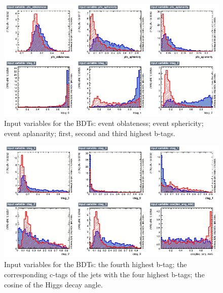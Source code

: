\begin{figure}[p]
	\centering
	\includegraphics[width=1.0\textwidth]{../Pictures/Analysis/BDTs/variables_id_c2.png}
	\caption{Input variables for the BDTs: event oblateness; event sphericity; event aplanarity; first, second and third highest b-tags.}
	\label{figure:analysis/results/tmva-inputs-2}
\end{figure}

\begin{figure}[p]
	\centering
	\includegraphics[width=1.0\textwidth]{../Pictures/Analysis/BDTs/variables_id_c3.png}
	\caption{Input variables for the BDTs: the fourth highest b-tag; the corresponding c-tags of the jets with the four highest b-tags; the cosine of the Higgs decay angle.}
	\label{figure:analysis/results/tmva-inputs-3}
\end{figure}

